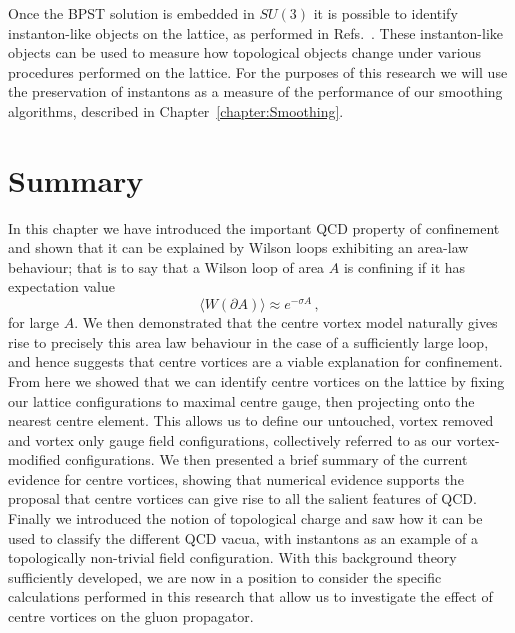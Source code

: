 Once the BPST solution is embedded in $SU(3)$ it is possible to identify instanton-like objects on the lattice, as performed in Refs.~\cite{Trewartha:2015ida,Moran:2008qd}. These instanton-like objects can be used to measure how topological objects change under various procedures performed on the lattice. For the purposes of this research we will use the preservation of instantons as a measure of the performance of our smoothing algorithms, described in Chapter~\ref{chapter:Smoothing}.

\section{Summary}
In this chapter we have introduced the important QCD property of confinement and shown that it can be explained by Wilson loops exhibiting an area-law behaviour; that is to say that a Wilson loop of area $A$ is confining if it has expectation value
%
\begin{equation}
\langle W(\partial A)\rangle \approx e^{-\sigma A}\, ,
\end{equation}
%
for large $A$. We then demonstrated that the centre vortex model naturally gives rise to precisely this area law behaviour in the case of a sufficiently large loop, and hence suggests that centre vortices are a viable explanation for confinement. From here we showed that we can identify centre vortices on the lattice by fixing our lattice configurations to maximal centre gauge, then projecting onto the nearest centre element. This allows us to define our untouched, vortex removed and vortex only gauge field configurations, collectively referred to as our vortex-modified configurations. We then presented a brief summary of the current evidence for centre vortices, showing that numerical evidence supports the proposal that centre vortices can give rise to all the salient features of QCD. Finally we introduced the notion of topological charge and saw how it can be used to classify the different QCD vacua, with instantons as an example of a topologically non-trivial field configuration. With this background theory sufficiently developed, we are now in a position to consider the specific calculations performed in this research that allow us to investigate the effect of centre vortices on the gluon propagator.

